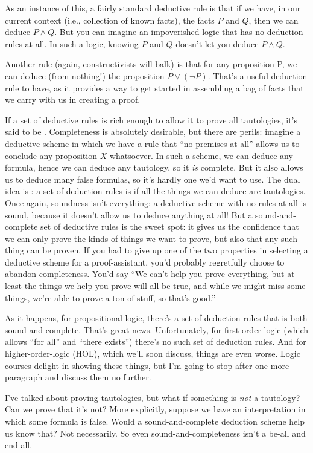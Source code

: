 As an instance of this, a fairly standard deductive rule is that if we have, in our current context (i.e., collection of known facts), the facts $P$ and $Q$, then we can deduce $P\wedge Q$. But you can imagine an impoverished logic that has no deduction rules at all. In such a logic, knowing $P$ and $Q$ doesn't let you deduce $P \wedge Q$. 

Another rule (again, constructivists will balk) is that for any proposition P, we can deduce (from nothing!) the proposition $P\vee(\neg P)$. That's a useful deduction rule to have, as it provides a way to get started in assembling a bag of facts that we carry with us in creating a proof.

If a set of deductive rules is rich enough to allow it to prove all tautologies, it's said to be . Completeness is absolutely desirable, but there are perils: imagine a deductive scheme in which we have a rule that ``no premises at all'' allows us to conclude any proposition $X$ whatsoever. In such a scheme, we can deduce any formula, hence we can deduce any tautology, so it \textit{is} complete. But it also allows us to deduce many false formulas, so it's hardly one we'd want to use. The dual idea is : a set of deduction rules is  if all the things we can deduce are tautologies. Once again, soundness isn't everything: a deductive scheme with no rules at all is sound, because it doesn't allow us to deduce anything at all! But a sound-and-complete set of deductive rules is the sweet spot: it gives us the confidence that we can only prove the kinds of things we want to prove, but also that any such thing can be proven. If you had to give up one of the two properties in selecting a deductive scheme for a proof-assistant, you'd probably regretfully choose to abandon completeness. You'd say ``We can't help you prove everything, but at least the things we help you prove will all be true, and while we might miss some things, we're able to prove a ton of stuff, so that's good.'' 

As it happens, for propositional logic, there's a set of deduction rules that is both sound and complete. That's great news. Unfortunately, for first-order logic (which allows ``for all'' and ``there exists'') there's no such set of deduction rules. And for higher-order-logic (HOL), which we'll soon discuss, things are even worse. Logic courses delight in showing these things, but I'm going to stop after one more paragraph and discuss them no further. 

I've talked about proving tautologies, but what if something is \textit{not} a tautology? Can we prove that it's not? More explicitly, suppose we have an interpretation in which some formula is false. Would a sound-and-complete deduction scheme help us know that? Not necessarily. So even sound-and-completeness isn't a be-all and end-all. 

